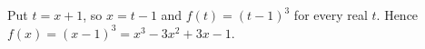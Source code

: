 Put $t=x+1$, so $x=t-1$ and $f(t)=(t-1)^3$ for every real $t$. Hence $f(x)=\boxed{(x-1)^3}=x^3-3x^2+3x-1$.
